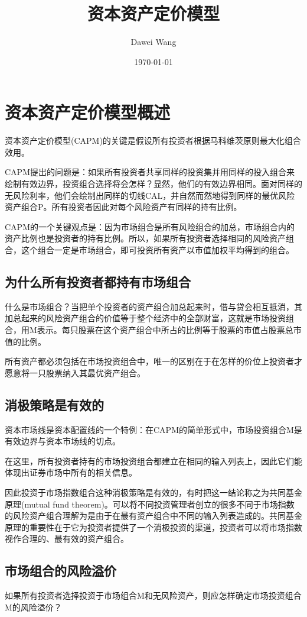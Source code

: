 \documentclass{article}
\title{资本资产定价模型}
\author{Dawei Wang}
\date{\today}
\begin{document}
	\maketitle
\section{资本资产定价模型概述}
资本资产定价模型(CAPM)的关键是假设所有投资者根据马科维茨原则最大化组合效用。

CAPM提出的问题是：如果所有投资者共享同样的投资集并用同样的投入组合来绘制有效边界，投资组合选择将会怎样？显然，他们的有效边界相同。面对同样的无风险利率，他们会绘制出同样的切线CAL，并自然而然地得到同样的最优风险资产组合P。所有投资者因此对每个风险资产有同样的持有比例。

CAPM的一个关键观点是：因为市场组合是所有风险组合的加总，市场组合内的资产比例也是投资者的持有比例。所以，如果所有投资者选择相同的风险资产组合，这个组合一定是市场组合，即可投资所有资产以市值加权平均得到的组合。

\subsection{为什么所有投资者都持有市场组合}
什么是市场组合？当把单个投资者的资产组合加总起来时，借与贷会相互抵消，其加总起来的风险资产组合的价值等于整个经济中的全部财富，这就是市场投资组合，用M表示。每只股票在这个资产组合中所占的比例等于股票的市值占股票总市值的比例。

所有资产都必须包括在市场投资组合中，唯一的区别在于在怎样的价位上投资者才愿意将一只股票纳入其最优资产组合。

\subsection{消极策略是有效的}
资本市场线是资本配置线的一个特例：在CAPM的简单形式中，市场投资组合M是有效边界与资本市场线的切点。

在这里，所有投资者持有的市场投资组合都建立在相同的输入列表上，因此它们能体现出证券市场中所有的相关信息。

因此投资于市场指数组合这种消极策略是有效的，有时把这一结论称之为共同基金原理(mutual fund theorem)。可以将不同投资管理者创立的很多不同于市场指数的风险资产组合理解为是由于在最有资产组合中不同的输入列表造成的。共同基金原理的重要性在于它为投资者提供了一个消极投资的渠道，投资者可以将市场指数视作合理的、最有效的资产组合。

\subsection{市场组合的风险溢价}
如果所有投资者选择投资于市场组合M和无风险资产，则应怎样确定市场投资组合M的风险溢价？
\end{document}
